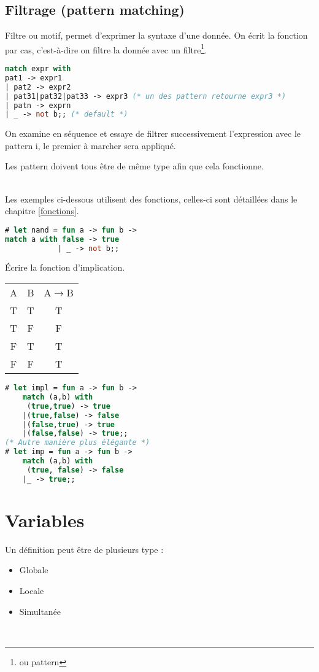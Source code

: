 \subsection{Filtrage (pattern matching)}
	Filtre ou motif, permet d'exprimer la syntaxe d'une donnée. On écrit la fonction par cas, c'est-à-dire on filtre la donnée avec un
	filtre\footnote{ou pattern}.
	\begin{lstlisting}[language=Caml, caption=Syntaxe du filtrage, numbers=none]
match expr with
pat1 -> expr1
| pat2 -> expr2
| pat31|pat32|pat33 -> expr3 (* un des pattern retourne expr3 *)
| patn -> exprn
| _ -> not b;; (* default *)
	\end{lstlisting}
	On examine en séquence et essaye de filtrer successivement l'expression avec le pattern i, le premier à marcher sera appliqué. 

	\begin{attention}
		Les pattern doivent tous être de même type afin que cela fonctionne.\\~
	\end{attention}
\begin{exemple}
	Les exemples ci-dessous utilisent des fonctions, celles-ci sont détaillées dans le chapitre \ref{fonctions}.
	\begin{lstlisting}[language=Caml, caption=Exemple filtrage, numbers=none, framerule=0pt]
# let nand = fun a -> fun b -> 
match a with false -> true
			| _ -> not b;;

\end{lstlisting}
Écrire la fonction d'implication.
\begin{tabular}{c|c||c}
	A&B&A$\rightarrow$B\\
	T&T&T\\
	T&F&F\\
	F&T&T\\
	F&F&T\\
\end{tabular}
	\begin{lstlisting}[language=Caml, caption=Exemple filtrage -- Implication, numbers=none, framerule=0pt]
# let impl = fun a -> fun b -> 
	match (a,b) with 
	 (true,true) -> true
	|(true,false) -> false
	|(false,true) -> true
	|(false,false) -> true;;
(* Autre manière plus élégante *)
# let imp = fun a -> fun b -> 
	match (a,b) with
	 (true, false) -> false
	|_ -> true;;
\end{lstlisting}
\end{exemple}

\section{Variables}
Un définition peut être de plusieurs type : 
\begin{itemize}
	\item Globale
	\item Locale
	\item Simultanée
\end{itemize}
~
